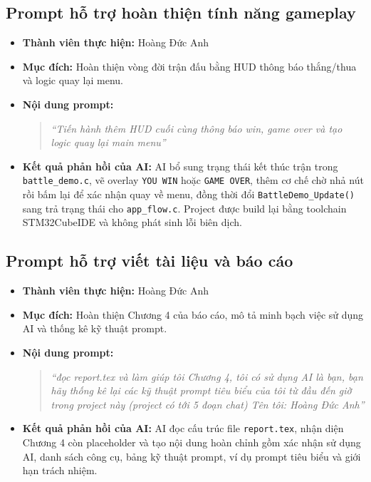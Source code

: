 \documentclass[a4paper,12pt]{report}
\begin{document}
\subsection{Prompt hỗ trợ hoàn thiện tính năng gameplay}

\begin{itemize}
    \item \textbf{Thành viên thực hiện:} Hoàng Đức Anh
    \item \textbf{Mục đích:} Hoàn thiện vòng đời trận đấu bằng HUD thông báo thắng/thua và logic quay lại menu.
    \item \textbf{Nội dung prompt:}
    \begin{quote}
    \textit{``Tiến hành thêm HUD cuối cùng thông báo win, game over và tạo logic quay lại main menu''}
    \end{quote}
    \item \textbf{Kết quả phản hồi của AI:} AI bổ sung trạng thái kết thúc trận trong \texttt{battle\_demo.c}, vẽ overlay \texttt{YOU WIN} hoặc \texttt{GAME OVER}, thêm cơ chế chờ nhả nút rồi bấm lại để xác nhận quay về menu, đồng thời đổi \texttt{BattleDemo\_Update()} sang trả trạng thái cho \texttt{app\_flow.c}. Project được build lại bằng toolchain STM32CubeIDE và không phát sinh lỗi biên dịch.
\end{itemize}

\subsection{Prompt hỗ trợ viết tài liệu và báo cáo}

\begin{itemize}
    \item \textbf{Thành viên thực hiện:} Hoàng Đức Anh
    \item \textbf{Mục đích:} Hoàn thiện Chương 4 của báo cáo, mô tả minh bạch việc sử dụng AI và thống kê kỹ thuật prompt.
    \item \textbf{Nội dung prompt:}
    \begin{quote}
    \textit{``đọc report.tex và làm giúp tôi Chương 4, tôi có sử dụng AI là bạn, bạn hãy thống kê lại các kỹ thuật prompt tiêu biểu của tôi từ đầu đến giờ trong project này (project có tới 5 đoạn chat) Tên tôi: Hoàng Đức Anh''}
    \end{quote}
    \item \textbf{Kết quả phản hồi của AI:} AI đọc cấu trúc file \texttt{report.tex}, nhận diện Chương 4 còn placeholder và tạo nội dung hoàn chỉnh gồm xác nhận sử dụng AI, danh sách công cụ, bảng kỹ thuật prompt, ví dụ prompt tiêu biểu và giới hạn trách nhiệm.
\end{itemize}
\end{document}
